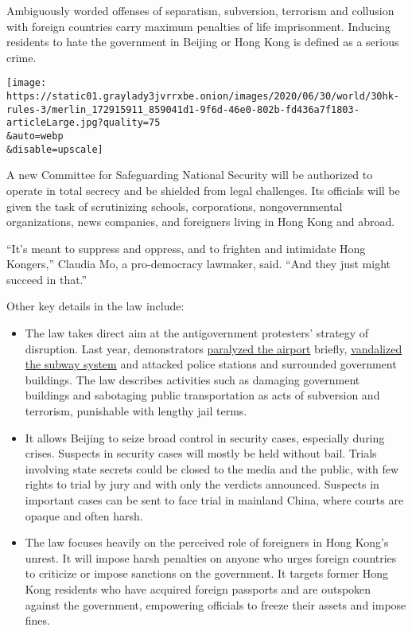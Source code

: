 Ambiguously worded offenses of separatism, subversion, terrorism and
collusion with foreign countries carry maximum penalties of life
imprisonment. Inducing residents to hate the government in Beijing or
Hong Kong is defined as a serious crime.

\texttt{[image: https://static01.graylady3jvrrxbe.onion/images/2020/06/30/world/30hk-rules-3/merlin\_172915911\_859041d1-9f6d-46e0-802b-fd436a7f1803-articleLarge.jpg?quality=75\\\&auto=webp\\\&disable=upscale]}

A new Committee for Safeguarding National Security will be authorized to
operate in total secrecy and be shielded from legal challenges. Its
officials will be given the task of scrutinizing schools, corporations,
nongovernmental organizations, news companies, and foreigners living in
Hong Kong and abroad.

``It's meant to suppress and oppress, and to frighten and intimidate
Hong Kongers,'' Claudia Mo, a pro-democracy lawmaker, said. ``And they
just might succeed in that.''

Other key details in the law include:

\begin{itemize}
\item
  The law takes direct aim at the antigovernment protesters' strategy of
  disruption. Last year, demonstrators
  \href{https://www.nytimes3xbfgragh.onion/2019/08/14/business/hong-kong-economy-airport-protests.html}{paralyzed
  the airport} briefly,
  \href{https://www.nytimes3xbfgragh.onion/2019/10/07/world/asia/hong-kong-protesters-masks-violence.html}{vandalized
  the subway system} and attacked police stations and surrounded
  government buildings. The law describes activities such as damaging
  government buildings and sabotaging public transportation as acts of
  subversion and terrorism, punishable with lengthy jail terms.
\item
  It allows Beijing to seize broad control in security cases, especially
  during crises. Suspects in security cases will mostly be held without
  bail. Trials involving state secrets could be closed to the media and
  the public, with few rights to trial by jury and with only the
  verdicts announced. Suspects in important cases can be sent to face
  trial in mainland China, where courts are opaque and often harsh.
\item
  The law focuses heavily on the perceived role of foreigners in Hong
  Kong's unrest. It will impose harsh penalties on anyone who urges
  foreign countries to criticize or impose sanctions on the government.
  It targets former Hong Kong residents who have acquired foreign
  passports and are outspoken against the government, empowering
  officials to freeze their assets and impose fines.
\end{itemize}

